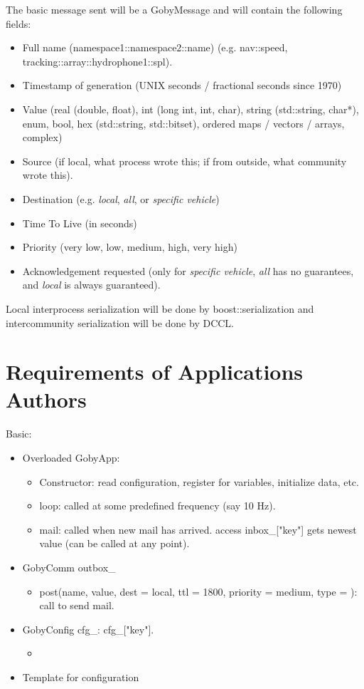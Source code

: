 \documentclass[10pt,letterpaper]{article}
\begin{document}
The basic message sent will be a GobyMessage and will contain the following fields:
\begin{itemize}
\item Full name (namespace1::namespace2::name) (e.g. nav::speed, tracking::array::hydrophone1::spl).
\item Timestamp of generation (UNIX seconds / fractional seconds since 1970)
\item Value (real (double, float), int (long int, int, char), string (std::string, char*), enum, bool, hex (std::string, std::bitset), ordered maps / vectors / arrays, complex)
\item Source (if local, what process wrote this; if from outside, what community wrote this).
\item Destination (e.g. \textit{local}, \textit{all}, or \textit{specific vehicle})
\item Time To Live (in seconds)
\item Priority (very low, low, medium, high, very high)
\item Acknowledgement requested (only for \textit{specific vehicle}, \textit{all} has no guarantees, and \textit{local} is always guaranteed).
\end{itemize}

Local interprocess serialization will be done by boost::serialization and intercommunity serialization will be done by DCCL.

\section{Requirements of Applications Authors}

Basic:
\begin{itemize}
\item Overloaded GobyApp:
\begin{itemize}
\item Constructor: read configuration, register for variables, initialize data, etc.
\item loop: called at some predefined frequency (say 10 Hz).
\item mail: called when new mail has arrived. access inbox\_["key"] gets newest value (can be called at any point). 
\end{itemize}
\item GobyComm outbox\_
\begin{itemize}
\item post(name, value, dest = local, ttl = 1800, priority = medium, type = ): call to send mail.
\end{itemize}
\item GobyConfig cfg\_: cfg\_["key"].
\begin{itemize}
\item
\end{itemize}
\item Template for configuration
\end{itemize}
\end{document}
